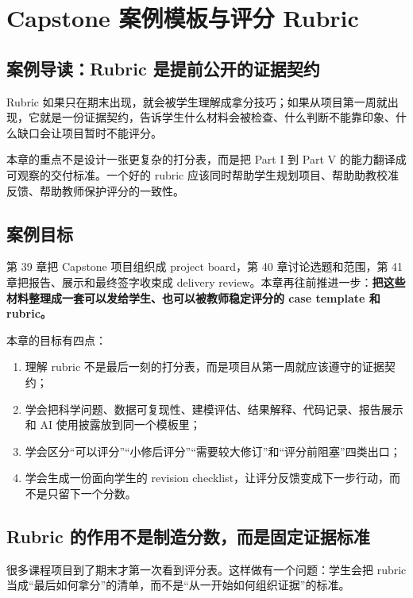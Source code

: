 \chapter{Capstone 案例模板与评分 Rubric}

\section{案例导读：Rubric 是提前公开的证据契约}

Rubric 如果只在期末出现，就会被学生理解成拿分技巧；如果从项目第一周就出现，它就是一份证据契约，告诉学生什么材料会被检查、什么判断不能靠印象、什么缺口会让项目暂时不能评分。

本章的重点不是设计一张更复杂的打分表，而是把 Part I 到 Part V 的能力翻译成可观察的交付标准。一个好的 rubric 应该同时帮助学生规划项目、帮助助教校准反馈、帮助教师保护评分的一致性。

\section{案例目标}

第 39 章把 Capstone 项目组织成 project board，第 40 章讨论选题和范围，第 41 章把报告、展示和最终签字收束成 delivery review。本章再往前推进一步：\textbf{把这些材料整理成一套可以发给学生、也可以被教师稳定评分的 case template 和 rubric。}

本章的目标有四点：

\begin{enumerate}
    \item 理解 rubric 不是最后一刻的打分表，而是项目从第一周就应该遵守的证据契约；
    \item 学会把科学问题、数据可复现性、建模评估、结果解释、代码记录、报告展示和 AI 使用披露放到同一个模板里；
    \item 学会区分“可以评分”“小修后评分”“需要较大修订”和“评分前阻塞”四类出口；
    \item 学会生成一份面向学生的 revision checklist，让评分反馈变成下一步行动，而不是只留下一个分数。
\end{enumerate}

\section{Rubric 的作用不是制造分数，而是固定证据标准}

很多课程项目到了期末才第一次看到评分表。这样做有一个问题：学生会把 rubric 当成“最后如何拿分”的清单，而不是“从一开始如何组织证据”的标准。

